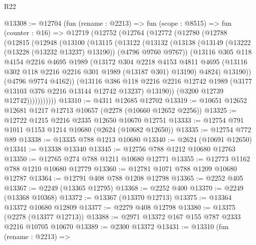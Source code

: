 \begin{lexlean}{R22}
\begin{coremodule}
@13308 := @12704
    (fun (rename : @2213) =>
    fun (scope : @8515) =>
    fun (counter : @16) =>
    @12719
      (@12752
        (@12764
          (@12772
            (@12780
              (@12788
                (@12815
                  (@12948
                    (@13100
                      (@13115
                        (@13122
                          (@13132
                            (@13138
                              (@13149 (@13222 (@13228 (@13232 @13237) @13190)) (@4796 @9760 @9767))
                              (@13116
                                @305
                                @118
                                @4154
                                @2216
                                @4695
                                @1989
                                (@13172
                                  @304
                                  @2218
                                  @4153
                                  @4811
                                  @4695
                                  (@13116 @302 @118 @2216 @2216 @301 @1989 (@13187 @301) @13190)
                                  @4824)
                                @13190))
                            (@4796 @9774 @4162))
                          (@13116
                            @386
                            @118
                            @2216
                            @2216
                            @12742
                            @1989
                            (@3177 @13103 @376 @2216 @13144 @12742 @13237)
                            @13190))
                        (@3200 @12739 @12742)))))))))))
@13310 := @4311 @12685 @12702
@13319 := @10651 @12652 @12681 @1217 @12713 @10657 (@2278 (@10660 @12652 @2256))
@13325 := @12722 @1215 @2216 @2335 @12650 @10670 @12751
@13333 := @12754 @791 @1011 @1153 @1214 @10680 (@2624 (@10682 @12650))
@13335 := @12754 @772 @89
@13338 := @13335 @788 @1213 @10680
@13340 := @2624 (@10691 @12650)
@13341 := @13338 @13340
@13345 := @12756 @788 @1212 @10680 @12763
@13350 := @12765 @274 @788 @1211 @10680 @12771
@13355 := @12773 @1162 @788 @1210 @10680 @12779
@13360 := @12781 @1071 @788 @1209 @10680 @12787
@13364 := @12791 @408 @788 @1208 @12798
@13365 := @2252 @405
@13367 := @2249 (@13365 @12795)
@13368 := @2252 @400
@13370 := @2249 (@13368 @10368)
@13372 := @13367 (@13370 @12713)
@13375 := @13364 @13372 @10680 @12809
@13377 := @2279 @408 @12798
@13380 := @13375 (@2278 (@13377 @12713))
@13388 := @2971 @13372 @167 @155 @787 @2333 @2216 @10705 @10670
@13389 := @2300 @13372
@13431 := @13310
    (fun (rename : @2213) =>

\end{coremodule}
\end{lexlean}
